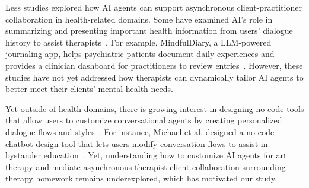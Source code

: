 Less studies explored how AI agents can support asynchronous client-practitioner collaboration in health-related domains. Some have examined AI's role in summarizing and presenting important health information from users' dialogue history to assist therapists~\cite{yang2024talk2care, kim2024mindfuldiary,10.1145/3659604}. For example, MindfulDiary, a LLM-powered journaling app, helps psychiatric patients document daily experiences and provides a clinician dashboard for practitioners to review entries~\cite{kim2024mindfuldiary}. 
However, these studies have not yet addressed how therapists can dynamically tailor AI agents to better meet their clients' mental health needs.

Yet outside of health domains, there is growing interest in designing no-code tools that allow users to customize conversational agents by creating personalized dialogue flows and styles~\cite{zheng2023synergizing, ha2024clochat, hedderich2024piece, Bhattacharjee2024}. For instance, Michael et al. designed a no-code chatbot design tool that lets users modify conversation flows to assist in bystander education~\cite{hedderich2024piece}. Yet, understanding how to customize AI agents for art therapy and mediate asynchronous therapist-client collaboration surrounding therapy homework remains underexplored, which has motivated our study.








